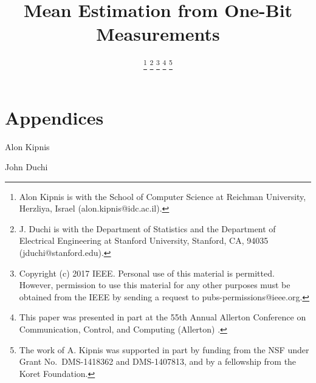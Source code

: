 \documentclass[letterpaper, 11pt]{IEEEtran}      %
\author{
    \IEEEauthorblockN{
Alon~Kipnis and   
    John~C.~Duchi}

\thanks{
Alon Kipnis is with the School of Computer Science at Reichman University, Herzliya, Israel (alon.kipnis@idc.ac.il).} 
\thanks{J. Duchi is with the Department of Statistics and the Department of Electrical Engineering at Stanford University, Stanford, CA, 94035 (jduchi@stanford.edu).}
\thanks{Copyright (c) 2017 IEEE. Personal use of this material is permitted.  However, permission to use this material for any other purposes must be obtained from the IEEE by sending a request to pubs-permissions@ieee.org.}
\thanks{This paper was presented in part at the 55th Annual Allerton Conference on Communication, Control, and Computing (Allerton) \cite{KipnisAllerton2017}. }
\thanks{
The work of A. Kipnis was supported in part by funding from the NSF under Grant No.~DMS-1418362 and DMS-1407813, and by a fellowship from the Koret Foundation.}
}
\title{\LARGE \bf Mean Estimation from One-Bit Measurements}
\begin{document}
\graphicspath{{./Figs/}}
\maketitle

















\newpage

\section*{Appendices}










\begin{IEEEbiographynophoto}{Alon Kipnis}

\end{IEEEbiographynophoto}


\begin{IEEEbiographynophoto}{John Duchi}

\end{IEEEbiographynophoto}
\end{document}
